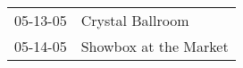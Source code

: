 \begin{supertabular}{p{0.25\columnwidth}p{0.75\columnwidth}}
 05-13-05 &       Crystal Ballroom \\
 05-14-05 &  Showbox at the Market \\
\end{supertabular}
